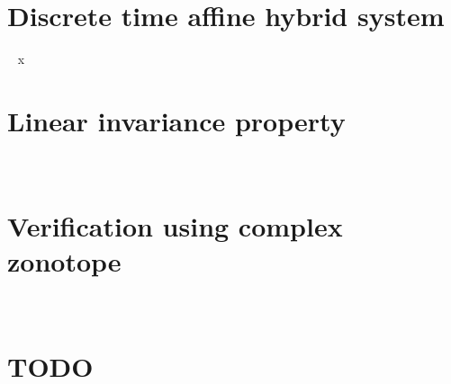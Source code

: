 \section{Discrete time affine hybrid system}~\label{sec:hybrid-system}
x

\section{Linear invariance property}~\label{sec:linear-invariance}


\section{Verification using complex zonotope}~\label{sec:verification-invariance}


\section{TODO}